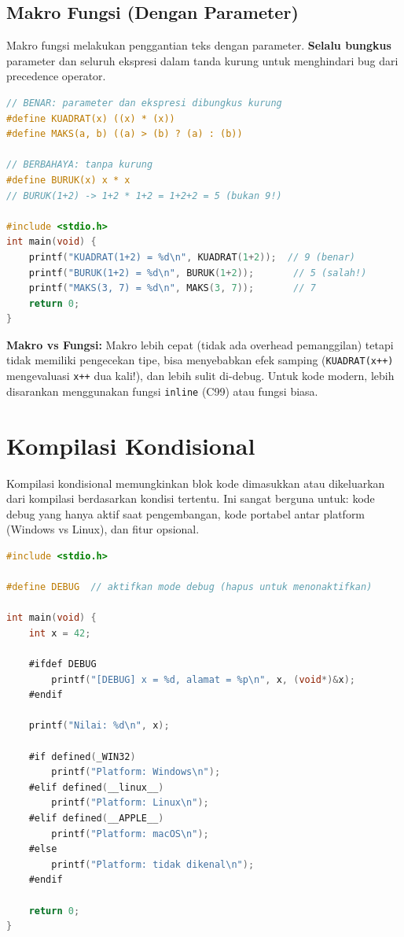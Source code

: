 \documentclass[../main.tex]{subfiles}
\begin{document}
\subsection{Makro Fungsi (Dengan Parameter)}

Makro fungsi melakukan penggantian teks dengan parameter. \textbf{Selalu bungkus} parameter dan seluruh ekspresi dalam tanda kurung untuk menghindari bug dari precedence operator.

\begin{lstlisting}[language=C,caption=Makro fungsi --- benar dan berbahaya]
// BENAR: parameter dan ekspresi dibungkus kurung
#define KUADRAT(x) ((x) * (x))
#define MAKS(a, b) ((a) > (b) ? (a) : (b))

// BERBAHAYA: tanpa kurung
#define BURUK(x) x * x
// BURUK(1+2) -> 1+2 * 1+2 = 1+2+2 = 5 (bukan 9!)

#include <stdio.h>
int main(void) {
    printf("KUADRAT(1+2) = %d\n", KUADRAT(1+2));  // 9 (benar)
    printf("BURUK(1+2) = %d\n", BURUK(1+2));       // 5 (salah!)
    printf("MAKS(3, 7) = %d\n", MAKS(3, 7));       // 7
    return 0;
}
\end{lstlisting}

\begin{catatan}
\textbf{Makro vs Fungsi:} Makro lebih cepat (tidak ada overhead pemanggilan) tetapi tidak memiliki pengecekan tipe, bisa menyebabkan efek samping (\texttt{KUADRAT(x++)} mengevaluasi \texttt{x++} dua kali!), dan lebih sulit di-debug. Untuk kode modern, lebih disarankan menggunakan fungsi \texttt{inline} (C99) atau fungsi biasa.
\end{catatan}

\section{Kompilasi Kondisional}

Kompilasi kondisional memungkinkan blok kode dimasukkan atau dikeluarkan dari kompilasi berdasarkan kondisi tertentu. Ini sangat berguna untuk: kode debug yang hanya aktif saat pengembangan, kode portabel antar platform (Windows vs Linux), dan fitur opsional.

\begin{lstlisting}[language=C,caption=Kompilasi kondisional]
#include <stdio.h>

#define DEBUG  // aktifkan mode debug (hapus untuk menonaktifkan)

int main(void) {
    int x = 42;
    
    #ifdef DEBUG
        printf("[DEBUG] x = %d, alamat = %p\n", x, (void*)&x);
    #endif
    
    printf("Nilai: %d\n", x);
    
    #if defined(_WIN32)
        printf("Platform: Windows\n");
    #elif defined(__linux__)
        printf("Platform: Linux\n");
    #elif defined(__APPLE__)
        printf("Platform: macOS\n");
    #else
        printf("Platform: tidak dikenal\n");
    #endif
    
    return 0;
}
\end{lstlisting}
\end{document}
